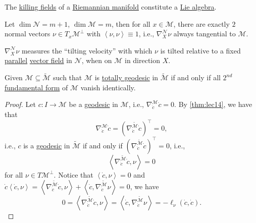 \begin{lemma}
	The \hyperref[def:killing-field]{killing fields} of a \hyperref[def:Riemannian-manifold]{Riemannian manifold} constitute a \hyperref[def:Lie-algebra]{Lie algebra}.
\end{lemma}

Let \(\dim \mathcal{N} = m+1\), \(\dim \mathcal{M} = m\), then for all \(x\in \mathcal{M} \), there are exactly \(2\) normal vectors \(\nu \in T_x \mathcal{M} ^{\perp} \) with \(\left\langle \nu, \nu \right\rangle \equiv 1\), i.e., \(\nabla _X^{\mathcal{N} } \nu \) always tangential to \(\mathcal{M} \).

\begin{remark}
	\(\nabla _X^{\mathcal{N} } \nu \) measures the ``tilting velocity'' with which \(\nu \) is tilted relative to a fixed \hyperref[def:parallel]{parallel} \hyperref[def:vector-field]{vector field} in \(\mathcal{N} \), when on \(\mathcal{M} \) in direction \(X\).
\end{remark}

\begin{theorem}\label{thm:lec15}
	Given \(\mathcal{M} \subseteq \widetilde{\mathcal{M}} \) such that \(\mathcal{M} \) is \hyperref[def:totally-geodesic]{totally geodesic} in \(\widetilde{\mathcal{M}} \) if and only if all \hyperref[def:2nd-fundamental-form]{\(2^{nd} \) fundamental form} of \(\mathcal{M} \) vanish identically.
\end{theorem}
\begin{proof}
	Let \(c\colon I \to \mathcal{M} \) be a \hyperref[def:geodesic]{geodesic} in \(\mathcal{M} \), i.e., \(\nabla _{\dot{c} }^{\mathcal{M}} \dot{c} = 0\). By \autoref{thm:lec14}, we have that
	\[
		\nabla _{\dot{c} }^{\mathcal{M}} \dot{c} = (\nabla _{\dot{c} }^{\widetilde{\mathcal{M}} } \dot{c} )^{\top} = 0 ,
	\]
	i.e., \(c\) is a \hyperref[def:geodesic]{geodesic} in \(\widetilde{\mathcal{M}} \) if and only if \((\nabla _{\dot{c} }^{\widetilde{\mathcal{M}} } \dot{c} )^{\top} = 0\), i.e.,
	\[
		\left\langle \nabla _{\dot{c} }^{\widetilde{\mathcal{M}} } \dot{c} , \nu  \right\rangle = 0
	\]
	for all \(\nu \in T \mathcal{M} ^{\perp} \). Notice that \(\left\langle \dot{c} , \nu \right\rangle = 0\) and \(\dot{c} \left\langle \dot{c} , \nu \right\rangle = \left\langle \nabla _{\dot{c} }^{\widetilde{\mathcal{M}} } \dot{c} , \nu \right\rangle + \left\langle \dot{c} , \nabla _{\dot{c} }^{\widetilde{\mathcal{M}} } \nu  \right\rangle = 0\), we have
	\[
		0 = \left\langle \nabla _{\dot{c}}^{\widetilde{\mathcal{M}} } \dot{c} , \nu  \right\rangle
		= \left\langle \dot{c} , \nabla _{\dot{c} }^{\widetilde{\mathcal{M}} } \nu \right\rangle
		= -\ell _{\nu } (\dot{c}, \dot{c}  ).
	\]
\end{proof}

